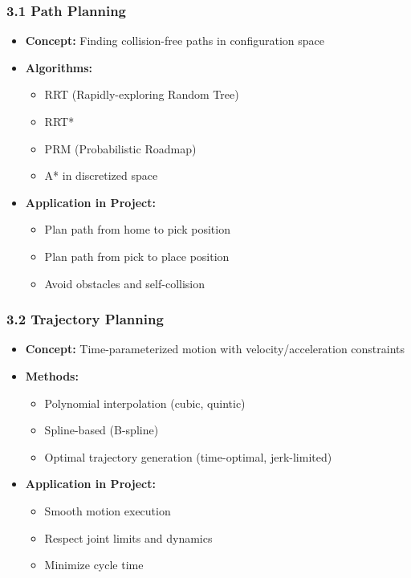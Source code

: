 \documentclass[
]{article}
\providecommand{\tightlist}{%
  \setlength{\itemsep}{0pt}\setlength{\parskip}{0pt}}
\begin{document}
\hypertarget{path-planning}{%
\subsubsection{3.1 Path Planning}\label{path-planning}}

\begin{itemize}
\tightlist
\item
  \textbf{Concept:} Finding collision-free paths in configuration space
\item
  \textbf{Algorithms:}

  \begin{itemize}
  \tightlist
  \item
    RRT (Rapidly-exploring Random Tree)
  \item
    RRT*
  \item
    PRM (Probabilistic Roadmap)
  \item
    A* in discretized space
  \end{itemize}
\item
  \textbf{Application in Project:}

  \begin{itemize}
  \tightlist
  \item
    Plan path from home to pick position
  \item
    Plan path from pick to place position
  \item
    Avoid obstacles and self-collision
  \end{itemize}
\end{itemize}

\hypertarget{trajectory-planning}{%
\subsubsection{3.2 Trajectory Planning}\label{trajectory-planning}}

\begin{itemize}
\tightlist
\item
  \textbf{Concept:} Time-parameterized motion with velocity/acceleration
  constraints
\item
  \textbf{Methods:}

  \begin{itemize}
  \tightlist
  \item
    Polynomial interpolation (cubic, quintic)
  \item
    Spline-based (B-spline)
  \item
    Optimal trajectory generation (time-optimal, jerk-limited)
  \end{itemize}
\item
  \textbf{Application in Project:}

  \begin{itemize}
  \tightlist
  \item
    Smooth motion execution
  \item
    Respect joint limits and dynamics
  \item
    Minimize cycle time
  \end{itemize}
\end{itemize}
\end{document}
